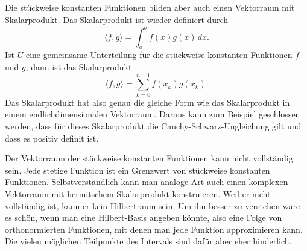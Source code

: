 Die stückweise konstanten Funktionen bilden aber auch einen Vektorraum
mit Skalarprodukt.
Das Skalarprodukt ist wieder definiert durch
\[
\langle f,g\rangle
=
\int_a^b
f(x) g(x)\,dx.
\]
Ist $U$ eine gemeinsame Unterteilung für die stückweise konstanten
Funktionen $f$ und $g$, dann ist das Skalarprodukt
\[
\langle f,g\rangle
=
\sum_{k=0}^{n-1} f(x_k) g(x_k).
\]
Das Skalarprodukt hat also genau die gleiche Form wie das Skalarprodukt
in einem endlichdimensionalen Vektorraum.
Daraus kann zum Beispiel geschlossen werden, dass für dieses Skalarprodukt
die Cauchy-Schwarz-Ungleichung gilt und dass es positiv definit ist.

Der Vektorraum der stückweise konstanten Funktionen kann nicht vollständig
sein.
Jede stetige Funktion ist ein Grenzwert von stückweise konstanten
Funktionen.
Selbstverständlich kann man analoge Art auch einen komplexen
Vektorraum mit hermitschem Skalarprodukt konstruieren.
Weil er nicht vollständig ist, kann er kein Hilbertraum sein.
Um ihn besser zu verstehen wäre es schön, wenn man eine Hilbert-Basis
angeben könnte, also eine Folge von orthonormierten Funktionen, mit
denen man jede Funktion approximieren kann.
Die vielen möglichen Teilpunkte des Intervals sind dafür aber eher 
hinderlich.

